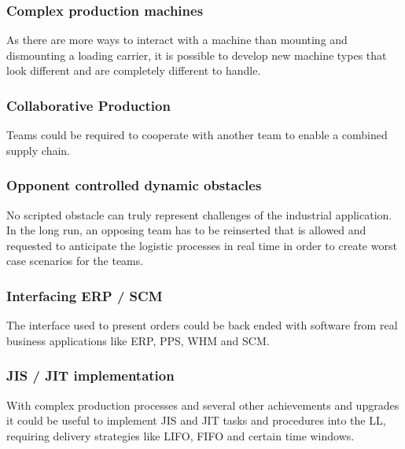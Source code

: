 \documentclass[12pt,twoside]{article}
\begin{document}
\subsubsection{Complex production machines}
As there are more ways to interact with a machine than mounting and
dismounting a loading carrier, it is possible to develop new machine
types that look different and are completely different to handle.

\subsubsection{Collaborative Production}
Teams could be required to cooperate with another team to enable a
combined supply chain. 

\subsubsection{Opponent controlled dynamic obstacles}
No scripted obstacle can truly represent challenges of the industrial
application. In the long run, an opposing team has to be reinserted
that is allowed and requested to anticipate the logistic processes in
real time in order to create worst case scenarios for the teams.

\subsubsection{Interfacing ERP / SCM}
The interface used to present orders could be back ended with software
from real business applications like ERP, PPS, WHM and SCM.

\subsubsection{JIS / JIT implementation}
With complex production processes and several other achievements and
upgrades it could be useful to implement JIS and JIT tasks and
procedures into the LL, requiring delivery strategies like LIFO, FIFO
and certain time windows.



 
\end{document}
